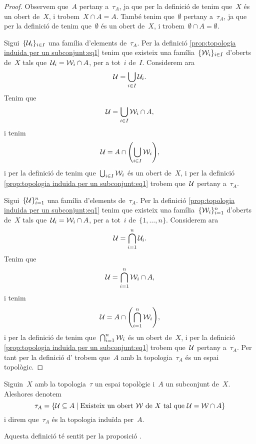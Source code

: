 \documentclass[../../main.tex]{subfiles}
\begin{document}
    \begin{proof}
        Observem que~\(A\) pertany a~\(\tau_{A}\), ja que per la definició de  tenim que~\(X\) és un obert de~\(X\), i trobem~\(X\cap A=A\).
        També tenim que~\(\emptyset\) pertany a~\(\tau_{A}\), ja que per la definició de  tenim que~\(\emptyset\) és un obert de~\(X\), i trobem~\(\emptyset\cap A=\emptyset\).

        Sigui~\(\{\mathcal{U}_{i}\}_{i\in I}\) una família d'elements de~\(\tau_{A}\).
        Per la definició \eqref{prop:topologia induida per un subconjunt:eq1} tenim que existeix una família~\(\{\mathcal{W}_{i}\}_{i\in I}\) d'oberts de~\(X\) tals que~\(\mathcal{U}_{i}=\mathcal{W}_{i}\cap A\), per a tot~\(i\) de~\(I\).
        Considerem ara
        \[
            \mathcal{U}=\bigcup_{i\in I}\mathcal{U}_{i}.
        \]
        Tenim que
        \[
            \mathcal{U}=\bigcup_{i\in I}\mathcal{W}_{i}\cap A,
        \]
        i tenim
        \[
            \obert{U}=A\cap\left(\bigcup_{i\in I}\obert{W}_{i}\right),
        \]
        i per la definició de  tenim que~\(\bigcup_{i\in I}\mathcal{W}_{i}\) és un obert de~\(X\), i per la definició \eqref{prop:topologia induida per un subconjunt:eq1} trobem que~\(\mathcal{U}\) pertany a~\(\tau_{A}\).

        Sigui~\(\{\mathcal{U}\}_{i=1}^{n}\) una família d'elements de~\(\tau_{A}\).
        Per la definició \eqref{prop:topologia induida per un subconjunt:eq1} tenim que existeix una família~\(\{\mathcal{W}_{i}\}_{i=1}^{n}\) d'oberts de~\(X\) tals que~\(\mathcal{U}_{i}=\mathcal{W}_{i}\cap A\), per a tot~\(i\) de~\(\{1,\dots,n\}\).
        Considerem ara
        \[
            \mathcal{U}=\bigcap_{i=1}^{n}\mathcal{U}_{i}.
        \]
        Tenim que
        \[
            \mathcal{U}=\bigcap_{i=1}^{n}\mathcal{W}_{i}\cap A,
        \]
        i tenim
        \[
            \obert{U}=A\cap\left(\bigcap_{i=1}^{n}\obert{W}_{i}\right),
        \]
        i per la definició de  tenim que~\(\bigcap_{i=1}^{n}\mathcal{W}_{i}\) és un obert de~\(X\), i per la definició \eqref{prop:topologia induida per un subconjunt:eq1} trobem que~\(\mathcal{U}\) pertany a~\(\tau_{A}\).
        Per tant per la definició d' trobem que~\(A\) amb la topologia~\(\tau_{A}\) és un espai topològic.
    \end{proof}
    \begin{definition}
        \label{def:topologia induida per un subconjunt}
        Siguin~\(X\) amb la topologia~\(\tau\) un espai topològic i~\(A\) un subconjunt de~\(X\).
        Aleshores denotem
        \[
            \tau_{A}=\{\mathcal{U}\subseteq A\mid\text{Existeix un obert }\mathcal{W}\text{ de }X\text{ tal que }\mathcal{U}=\mathcal{W}\cap A\}
        \]
        i direm que~\(\tau_{A}\) és la topologia induïda per~\(A\).

        Aquesta definició té sentit per la proposició .
    \end{definition}
\end{document}
